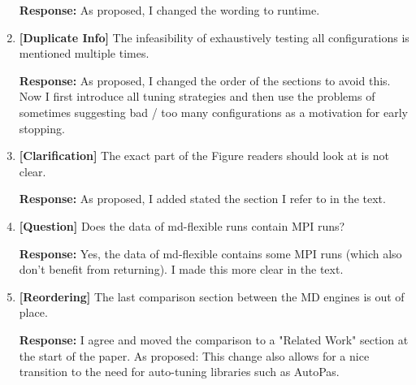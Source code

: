 \documentclass[12pt,a4paper]{article}
\begin{document}
\begin{enumerate}[label=\textbf{Comment \arabic*:}, itemsep=0.8em]
          \textbf{Response:} As proposed, I changed the wording to runtime.

    \item \textbf{[Duplicate Info]} The infeasibility of exhaustively testing all configurations is mentioned multiple times.

          \textbf{Response:} As proposed, I changed the order of the sections to avoid this. Now I first introduce all tuning strategies and then use the problems of sometimes suggesting bad / too many configurations as a motivation for early stopping.

    \item \textbf{[Clarification]} The exact part of the Figure readers should look at is not clear.

          \textbf{Response:} As proposed, I added stated the section I refer to in the text.

    \item \textbf{[Question]} Does the data of md-flexible runs contain MPI runs?

          \textbf{Response:} Yes, the data of md-flexible contains some MPI runs (which also don't benefit from returning). I made this more clear in the text.

    \item \textbf{[Reordering]} The last comparison section between the MD engines is out of place.

          \textbf{Response:} I agree and moved the comparison to a "Related Work" section at the start of the paper. As proposed: This change also allows for a nice transition to the need for auto-tuning libraries such as AutoPas.
\end{enumerate}
\end{document}
